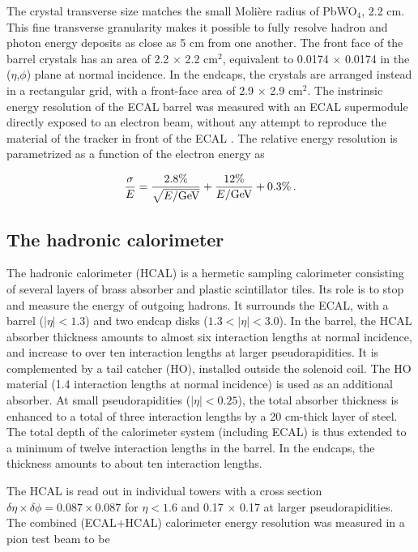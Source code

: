 The crystal transverse size matches the small Molière radius of PbWO$_4$, 2.2 cm. This fine transverse granularity makes it possible to fully resolve hadron and photon energy deposits as close as 5 cm from one another. The front face of the barrel crystals has an area of 2.2 $\times$ 2.2 cm$^2$, equivalent to 0.0174 $\times$ 0.0174 in the ($\eta$,$\phi$) plane at normal incidence. In the endcaps, the crystals are arranged instead in a rectangular grid, with a front-face area of 2.9 $\times$ 2.9 cm$^2$. The instrinsic energy resolution of the ECAL barrel was measured with an ECAL supermodule directly exposed to an electron beam, without any attempt to reproduce the material of the tracker in front of the ECAL \cite{Ingram_2007}. The relative energy resolution is parametrized as a function of the electron energy as 

\begin{equation}
    \frac{\sigma}{E} = \frac{2.8\%}{\sqrt{E / \mathrm{GeV}}} + \frac{12\%}{E / \mathrm{GeV}} + 0.3\% \mend
\end{equation}

\subsection{The hadronic calorimeter}

The hadronic calorimeter (HCAL) \cite{CERN-LHCC-97-031} is a hermetic sampling calorimeter consisting of several layers of brass absorber and plastic scintillator tiles. Its role is to stop and measure the energy of outgoing hadrons. It surrounds the ECAL, with a barrel ($|\eta| < 1.3$) and two endcap disks ($1.3 < |\eta| < 3.0$). In the barrel, the HCAL absorber thickness amounts to almost six interaction lengths at normal incidence, and increase to over ten interaction lengths at larger pseudorapidities. It is complemented by a tail catcher (HO), installed outside the solenoid coil. The HO material (1.4 interaction lengths at normal incidence) is used as an additional absorber. At small pseudorapidities ($|\eta| < 0.25$), the total absorber thickness is enhanced to a total of three interaction lengths by a 20 cm-thick layer of steel. The total depth of the calorimeter system (including ECAL) is thus extended to a minimum of twelve interaction lengths in the barrel. In the endcaps, the thickness amounts to about ten interaction lengths.

The HCAL is read out in individual towers with a cross section $\delta\eta \times \delta\phi = 0.087 \times 0.087$ for $\eta < 1.6$ and 0.17 $\times$ 0.17 at larger pseudorapidities. The combined (ECAL+HCAL) calorimeter energy resolution was measured in a pion test beam to be 

